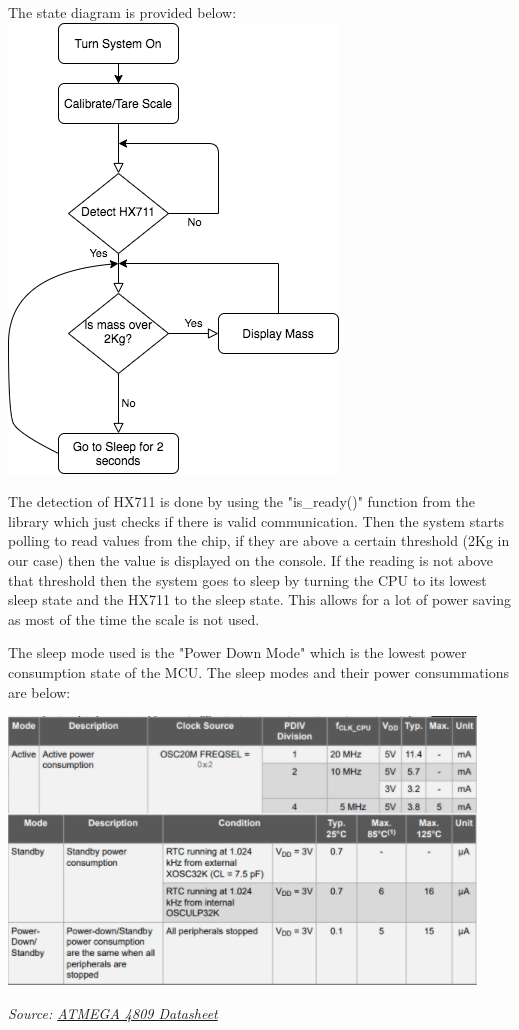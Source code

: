 \documentclass[10pt]{article}
\begin{document}
The state diagram is provided below:
\includegraphics[scale=.7]{Flow}

The detection of HX711 is done by using the "is\_ready()" function from the library which just checks if there is valid communication. Then the system starts polling to read values from the chip, if they are above a certain threshold (2Kg in our case) then the value is displayed on the console. If the reading is not above that threshold then the system goes to sleep by turning the CPU to its lowest sleep state and the HX711 to the sleep state. This allows for a lot of power saving as most of the time the scale is not used.

The sleep mode used is the "Power Down Mode" which is the lowest power consumption state of the MCU. The sleep modes and their power consummations are below:
{\center\includegraphics[scale=.7]{powermodes}\par}
{\textit{Source: \href{http://ww1.microchip.com/downloads/en/DeviceDoc/ATmega4808-4809-Data-Sheet-DS40002173A.pdf}{ATMEGA 4809 Datasheet}}}
\end{document}
